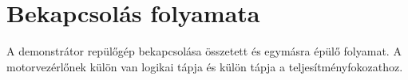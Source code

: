 \pagebreak
\section{Bekapcsolás folyamata}\label{section-turnon}

A demonstrátor repülőgép bekapcsolása összetett és egymásra épülő folyamat. A motorvezérlőnek külön van logikai tápja és külön tápja a teljesítményfokozathoz.
 


%
%
%
%
